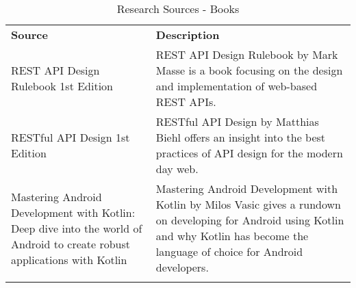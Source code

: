 \begin{longtable}{ |p{4cm}|p{10cm}|  }
		\hline
		\textbf{Source} & \textbf{Description} \\
		REST API Design Rulebook 1st Edition & REST API Design Rulebook by Mark Masse\cite{restapidesignrulebook} is a book focusing on the design and implementation of web-based REST APIs.\\
		\hline
		RESTful API Design 1st Edition & RESTful API Design by Matthias Biehl\cite{restfulapidesign} offers an insight into the best practices of API design for the modern day web.\\
		\hline
		Mastering Android Development with Kotlin: Deep dive into the world of Android to create robust applications with Kotlin & Mastering Android Development with Kotlin by Milos Vasic\cite{androidkotlindevbook} gives a rundown on developing for Android using Kotlin and why Kotlin has become the language of choice for Android developers.\\
		\hline
    \caption{Research Sources - Books}
	\label{bookstable}
\end{longtable}




